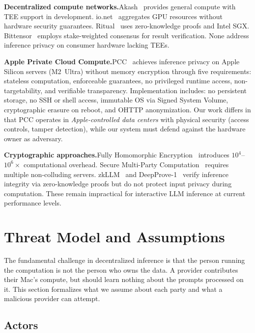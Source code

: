 \documentclass[10pt,twocolumn,letterpaper]{article}
\begin{document}
\textbf{Decentralized compute networks.}\quad Akash~\cite{akash} provides general compute with TEE support in development. io.net~\cite{ionet} aggregates GPU resources without hardware security guarantees. Ritual~\cite{ritual} uses zero-knowledge proofs and Intel SGX. Bittensor~\cite{bittensor} employs stake-weighted consensus for result verification. None address inference privacy on consumer hardware lacking TEEs.

\textbf{Apple Private Cloud Compute.}\quad PCC~\cite{apple-pcc} achieves inference privacy on Apple Silicon servers (M2~Ultra) without memory encryption through five requirements: stateless computation, enforceable guarantees, no privileged runtime access, non-targetability, and verifiable transparency. Implementation includes: no persistent storage, no SSH or shell access, immutable OS via Signed System Volume, cryptographic erasure on reboot, and OHTTP anonymization. Our work differs in that PCC operates in \emph{Apple-controlled data centers} with physical security (access controls, tamper detection), while our system must defend against the hardware owner as adversary.

\textbf{Cryptographic approaches.}\quad Fully Homomorphic Encryption~\cite{gentry-fhe} introduces $10^4$--$10^6\times$ computational overhead. Secure Multi-Party Computation~\cite{yao-mpc} requires multiple non-colluding servers. zkLLM~\cite{zkllm} and DeepProve-1~\cite{deepprove} verify inference integrity via zero-knowledge proofs but do not protect input privacy during computation. These remain impractical for interactive LLM inference at current performance levels.

\section{Threat Model and Assumptions}
\label{sec:threat}

The fundamental challenge in decentralized inference is that the person running the computation is not the person who owns the data. A provider contributes their Mac's compute, but should learn nothing about the prompts processed on it. This section formalizes what we assume about each party and what a malicious provider can attempt.

\subsection{Actors}
\end{document}
